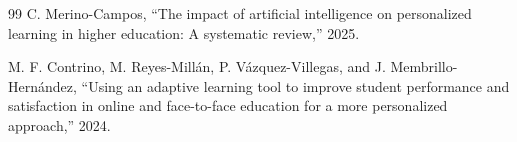 \documentclass[conference]{IEEEtran}
\begin{document}
\begin{thebibliography}{99}
C. Merino-Campos,
``The impact of artificial intelligence on personalized learning in higher
education: A systematic review,'' 2025.

M. F. Contrino, M. Reyes-Millán, P. Vázquez-Villegas,
and J. Membrillo-Hernández,
``Using an adaptive learning tool to improve student performance and
satisfaction in online and face-to-face education for a more personalized
approach,'' 2024.

\end{thebibliography}
\end{document}
